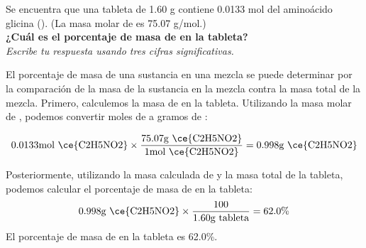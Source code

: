 Se encuentra que una tableta de 1.60 g contiene 0.0133 mol del aminoácido glicina (). (La masa molar de  es 75.07 g/mol.)\\
\textbf{¿Cuál es el porcentaje de masa de  en la tableta?}\\
\emph{Escribe tu respuesta usando tres cifras significativas.}\\
\begin{solutionbox}{6cm}
    El porcentaje de masa de una sustancia en una mezcla se puede determinar por la comparación de la masa de la sustancia en la mezcla contra la masa total de la mezcla.
    Primero, calculemos la masa de  en la tableta. Utilizando la masa molar de , podemos convertir moles de  a gramos de :

\[0.0133\text{mol \ce{C2H5NO2}} \times \frac{75.07\text{g \ce{C2H5NO2}}}{1\text{mol \ce{C2H5NO2}}} = 0.998 \text{g \ce{C2H5NO2}}\]

    Posteriormente, utilizando la masa calculada de  y la masa total de la tableta, podemos calcular el porcentaje de masa de  en la tableta:
    \[0.998\text{g \ce{C2H5NO2}} \times \frac{100}{1.60\text{g tableta}} = 62.0\%\]
    El porcentaje de masa de  en la tableta es 62.0\%.
\end{solutionbox}